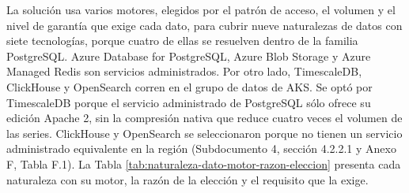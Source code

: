 \documentclass[subdoc]{../../comun/overfore}
\begin{document}
La solución usa varios motores, elegidos por el patrón de acceso, el volumen y el nivel de garantía que exige cada dato, para cubrir nueve naturalezas de datos con siete tecnologías, porque cuatro de ellas se resuelven dentro de la familia PostgreSQL. Azure Database for PostgreSQL, Azure Blob Storage y Azure Managed Redis son servicios administrados. Por otro lado, TimescaleDB, ClickHouse y OpenSearch corren en el grupo de datos de AKS. Se optó por TimescaleDB porque el servicio administrado de PostgreSQL sólo ofrece su edición Apache 2, sin la compresión nativa que reduce cuatro veces el volumen de las series. ClickHouse y OpenSearch se seleccionaron porque no tienen un servicio administrado equivalente en la región (Subdocumento 4, sección 4.2.2.1 y Anexo F, Tabla F.1). La Tabla \ref{tab:naturaleza-dato-motor-razon-eleccion} presenta cada naturaleza con su motor, la razón de la elección y el requisito que la exige.
\end{document}
